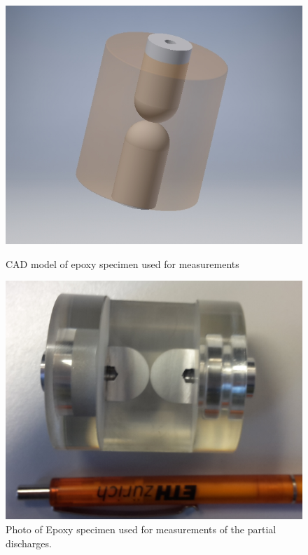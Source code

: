 \begin{figure}[!ht]
  \begin{minipage}{0.5\textwidth}
  

  
  \centerline{\includegraphics[height=0.2\textheight]{figures/intro/cad_epoxy}}
\caption{CAD model of epoxy specimen used for measurements\protect\footnotemark}
	\label{fig.specimen}
	
	  \end{minipage}
	    \begin{minipage}{0.5\textwidth}
	  
  \centerline{\includegraphics[height=0.2\textheight]{figures/intro/photo_epoxy2}}
\caption{Photo of Epoxy specimen used for measurements of the partial discharges. \protect\footnotemark}
	\label{fig.specimenphoto}
	  
	   \end{minipage}
\end{figure}

